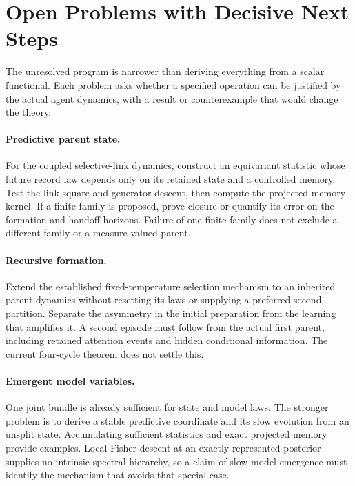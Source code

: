 \section{Open Problems with Decisive Next Steps}\label{sec:open_problems}

The unresolved program is narrower than deriving everything from a scalar functional. Each problem asks whether a specified operation can be justified by the actual agent dynamics, with a result or counterexample that would change the theory.

\paragraph{Predictive parent state.}
For the coupled selective-link dynamics, construct an equivariant statistic whose future record law depends only on its retained state and a controlled memory. Test the link square and generator descent, then compute the projected memory kernel. If a finite family is proposed, prove closure or quantify its error on the formation and handoff horizons. Failure of one finite family does not exclude a different family or a measure-valued parent.

\paragraph{Recursive formation.}
Extend the established fixed-temperature selection mechanism to an inherited parent dynamics without resetting its laws or supplying a preferred second partition. Separate the asymmetry in the initial preparation from the learning that amplifies it. A second episode must follow from the actual first parent, including retained attention events and hidden conditional information. The current four-cycle theorem does not settle this.

\paragraph{Emergent model variables.}
One joint bundle is already sufficient for state and model laws. The stronger problem is to derive a stable predictive coordinate and its slow evolution from an unsplit state. Accumulating sufficient statistics and exact projected memory provide examples. Local Fisher descent at an exactly represented posterior supplies no intrinsic spectral hierarchy, so a claim of slow model emergence must identify the mechanism that avoids that special case.

